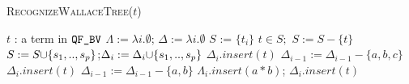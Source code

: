 \begin{algorithm}[t]
 \caption{\textsc{RecognizeWallaceTree}($t$)}
 \label{alg:grade}
 \begin{algorithmic}[1]
   \Ensure $t$ : a term in $\texttt{QF\_BV}$
   \State $\Lambda := \lambda i. \emptyset$;
   $\Delta := \lambda i. \emptyset$
   \State $S$ := $\{t_i\}$
   \State $t \in S;$ $S := S - \{t\}$
   \State $S := S {\cup} \{s_1,..,s_p\}$;$\Delta_i := \Delta_i {\cup} \{s_1,..,s_p\}$
   \State $\Delta_i.insert( t )$
   \State $\Delta_{i-1} := \Delta_{i-1}- \{a,b,c\}$
   \State $\Delta_i.insert( t )$
   \State $\Delta_{i-1} := \Delta_{i-1}- \{a,b\}$
   \State $\Lambda_i.insert( a * b )$;
    $\Delta_i.insert( t )$
   \Else~\Return{$\emptyset$}
   \EndIf
   \EndFor
   ~\Return{$\emptyset$}
   \EndFor
   \State {}
   \EndIf
   \State~\Return{$\emptyset$}
 \end{algorithmic}
\end{algorithm}  



